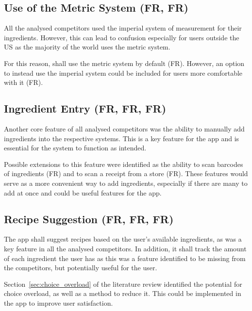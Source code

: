 \subsection{Use of the Metric System (FR, FR)}

All the analysed competitors used the imperial system of measurement for their ingredients. However, this
can lead to confusion especially for users outside the US as the majority of the world uses the metric system.~\cite{pomroy_metric_2008}

For this reason, \chef{} shall use the metric system by default (FR). However, an option to
instead use the imperial system could be included for users more comfortable with it (FR).

\subsection{Ingredient Entry (FR, FR, FR)}

Another core feature of all analysed competitors was the ability to manually add ingredients into the respective
systems. This is a key feature for the \chef{} app and is essential for the system to function as intended.

Possible extensions to this feature were identified as the ability to scan barcodes of ingredients (FR)
and to scan a receipt from a store (FR). These features would serve as a more convenient way to add
ingredients, especially if there are many to add at once and could be useful features for the \chef{} app.

\subsection{Recipe Suggestion (FR, FR, FR)}
The app shall suggest recipes based on the user's available ingredients, as was a key feature in
all the analysed competitors. In addition, it shall track the amount of each ingredient the user has
as this was a feature identified to be missing from the competitors, but potentially useful for the user.

Section~\ref{sec:choice_overload} of the literature review identified the potential for choice overload,
as well as a method to reduce it. This could be implemented in the \chef{} app to improve user satisfaction.

